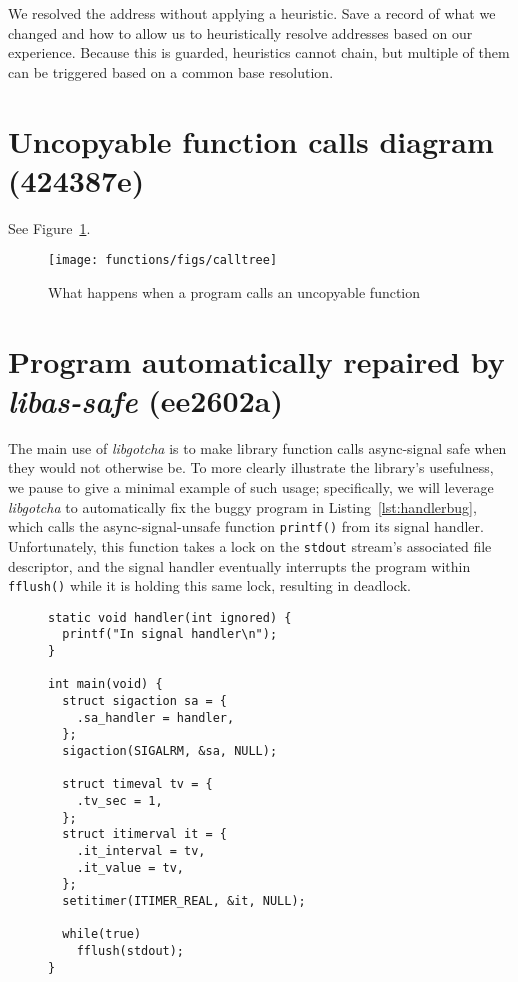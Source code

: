 \documentclass[12pt,letterpaper]{book}
\makeatletter
\let\includegraphics@\includegraphics
\renewcommand{\includegraphics}[2][]{\includegraphics@[#1]{\includegraphicsdir#2}}
\newcommand{\includegraphicsdir}{}
\makeatother
\begin{document}
We resolved the address without applying a heuristic.  Save a record of what we
changed and how to allow us to heuristically resolve addresses based on our
experience.  Because this is guarded, heuristics cannot chain, but multiple of
them can be triggered based on a common base resolution.


\section{Uncopyable function calls diagram (424387e)}

See Figure~\ref{fig:uncopyable}.

\begin{figure}
\texttt{[image: functions/figs/calltree]}
\caption{What happens when a program calls an uncopyable function}
\label{fig:uncopyable}
\end{figure}


\section{Program automatically repaired by \textit{libas-safe} (ee2602a)}

The main use of \textit{libgotcha} is to make library function calls async-signal safe when
they would not otherwise be.  To more clearly illustrate the library's usefulness, we
pause to give a minimal example of such usage; specifically, we will leverage
\textit{libgotcha} to automatically fix the buggy program in Listing~\ref{lst:handlerbug},
which calls the async-signal-unsafe function \texttt{printf()} from its signal
handler.  Unfortunately, this function takes a lock on the \texttt{stdout} stream's
associated file descriptor, and the signal handler eventually interrupts the program
within \texttt{fflush()} while it is holding this same lock, resulting in deadlock.

\begin{figure}
\begin{lstlisting}[label=lst:handlerbug,caption=C program with a buggy signal handler]
static void handler(int ignored) {
  printf("In signal handler\n");
}

int main(void) {
  struct sigaction sa = {
    .sa_handler = handler,
  };
  sigaction(SIGALRM, &sa, NULL);

  struct timeval tv = {
    .tv_sec = 1,
  };
  struct itimerval it = {
    .it_interval = tv,
    .it_value = tv,
  };
  setitimer(ITIMER_REAL, &it, NULL);

  while(true)
    fflush(stdout);
}
\end{lstlisting}
\end{figure}
\end{document}
